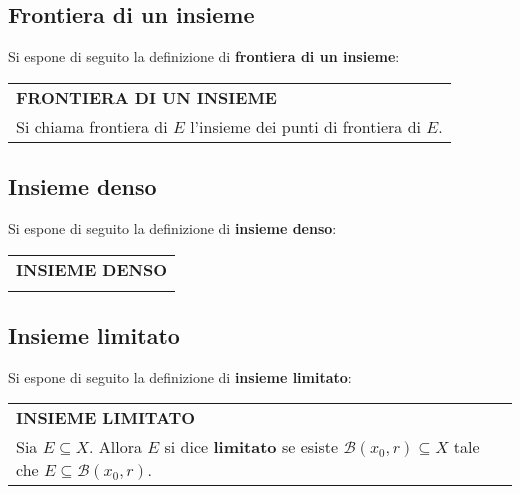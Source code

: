 \documentclass[a4paper]{extarticle}
\renewcommand\arraystretch{}
\begin{document}
\vspace{1em}
\noindent
\subsection{Frontiera di un insieme}
Si espone di seguito la definizione di \textbf{frontiera di un insieme}:

\vspace{1em}
\setlength{\tabcolsep}{14pt}
\renewcommand{\arraystretch}{2}
\noindent
\begin{tabularx}{\textwidth}{@{}|P|@{}}
    \hline
    {\textbf{FRONTIERA DI UN INSIEME}}\\
    \parbox{\linewidth}{Si chiama frontiera di $E$ l'insieme dei punti di frontiera di $E$.
    \vspace{3mm}}\\
    \hline
\end{tabularx}


\vspace{1em}
\noindent
\subsection{Insieme denso}
Si espone di seguito la definizione di \textbf{insieme denso}:

\vspace{1em}
\setlength{\tabcolsep}{14pt}
\renewcommand{\arraystretch}{2}
\noindent
\begin{tabularx}{\textwidth}{@{}|P|@{}}
    \hline
    {\textbf{INSIEME DENSO}}\\
    \parbox{\linewidth}{
    \vspace{-1mm}}\\
    \hline
\end{tabularx}

\vspace{1em}
\noindent
\subsection{Insieme limitato}
Si espone di seguito la definizione di \textbf{insieme limitato}:

\vspace{1em}
\setlength{\tabcolsep}{14pt}
\renewcommand{\arraystretch}{2}
\noindent
\begin{tabularx}{\textwidth}{@{}|P|@{}}
    \hline
    {\textbf{INSIEME LIMITATO}}\\
    \parbox{\linewidth}{Sia $E \subseteq X$. Allora $E$ si dice \textbf{limitato} se esiste $\mathcal{B}(x_0,r) \subseteq X$ tale che $E \subseteq \mathcal{B}(x_0,r)$.
    \vspace{3mm}}\\
    \hline
\end{tabularx}
\end{document}
